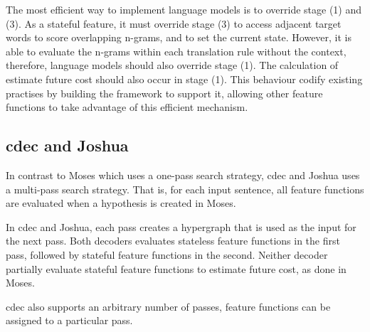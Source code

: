 \documentclass{pbml}
\begin{document}
The most efficient way to implement language models is to override stage (1) and (3). As a stateful feature, it must override stage (3) to access adjacent target words to score overlapping n-grams, and to set the current state. However, it is able to evaluate the n-grams within each translation rule without the context, therefore, language models should also override stage (1). The calculation of estimate future cost should also occur in stage (1). This behaviour codify existing practises by building the framework to support it, allowing other feature functions to take advantage of this efficient mechanism.

\subsection{cdec and Joshua}
In contrast to Moses which uses a one-pass search strategy, cdec and Joshua uses a multi-pass search strategy. That is, for each input sentence, all feature functions are evaluated when a hypothesis is created in Moses.

In cdec and Joshua, each pass creates a hypergraph that is used as the input for the next pass. Both decoders evaluates stateless feature functions in the first pass, followed by stateful feature functions in the second. Neither decoder partially evaluate stateful feature functions to estimate future cost, as done in Moses.

cdec also supports an arbitrary number of passes, feature functions can be assigned to a particular pass.
\end{document}
